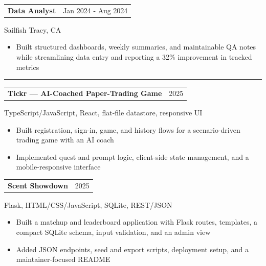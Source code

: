 \documentclass[10pt,letterpaper]{article}
\makeatletter
\newcommand{\sectionheader}[1]{%
  \vspace{4pt}
  \noindent\rule{\textwidth}{0.35pt}\par
  \vspace{4pt}
  \noindent{\fontsize{12.5}{13.5}\selectfont\textbf{#1}}\par
  \vspace{3pt}
}
\newcommand{\roleline}[2]{%
  \noindent
  \begin{tabular*}{\textwidth}{@{\extracolsep{\fill}} l r}
    \textbf{#1} & #2 \\
  \end{tabular*}
  \vspace{-2pt}
}
\newcommand{\orgline}[1]{%
  #1\par
  \vspace{1pt}
}
\newcommand{\techline}[1]{%
  #1\par
  \vspace{1pt}
}
\newcommand{\entryspace}{\vspace{2pt}}
\makeatother
\begin{document}
\entryspace

\roleline{Data Analyst}{Jan 2024 - Aug 2024}
\orgline{Sailfish \textbar{} Tracy, CA}
\begin{itemize}
  \item Built structured dashboards, weekly summaries, and maintainable QA notes while streamlining data entry and reporting a 32\% improvement in tracked metrics
\end{itemize}

\sectionheader{PROJECT EXPERIENCE}

\roleline{Tickr --- AI-Coached Paper-Trading Game}{2025}
\techline{TypeScript/JavaScript, React, flat-file datastore, responsive UI}
\begin{itemize}
  \item Built registration, sign-in, game, and history flows for a scenario-driven trading game with an AI coach
  \item Implemented quest and prompt logic, client-side state management, and a mobile-responsive interface
\end{itemize}

\entryspace

\roleline{Scent Showdown}{2025}
\techline{Flask, HTML/CSS/JavaScript, SQLite, REST/JSON}
\begin{itemize}
  \item Built a matchup and leaderboard application with Flask routes, templates, a compact SQLite schema, input validation, and an admin view
  \item Added JSON endpoints, seed and export scripts, deployment setup, and a maintainer-focused README
\end{itemize}
\end{document}
